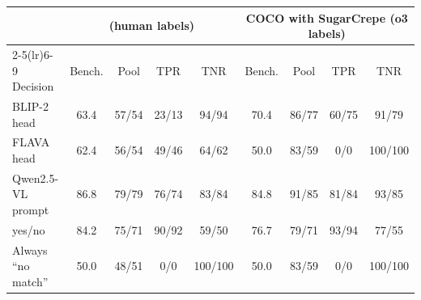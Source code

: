 \begin{tabular}{l cccc cccc}
\toprule
& \multicolumn{4}{c}{\svo{} (human labels)} & \multicolumn{4}{c}{COCO with SugarCrepe (o3 labels)}\\
\cmidrule(lr){2-5}\cmidrule(lr){6-9}
Decision & Bench. & Pool & TPR & TNR & Bench. & Pool & TPR & TNR\\
\midrule
BLIP-2 head & 63.4 & 57/54 & 23/13 & 94/94 & 70.4 & 86/77 & 60/75 & 91/79 \\
FLAVA head & 62.4 & 56/54 & 49/46 & 64/62 & 50.0 & 83/59 & 0/0 & 100/100 \\
Qwen2.5-VL prompt & 86.8 & 79/79 & 76/74 & 83/84 & 84.8 & 91/85 & 81/84 & 93/85 \\
\qemb{} yes/no & 84.2 & 75/71 & 90/92 & 59/50 & 76.7 & 79/71 & 93/94 & 77/55 \\
\midrule
Always ``no match'' & 50.0 & 48/51 & 0/0 & 100/100 & 50.0 & 83/59 & 0/0 & 100/100 \\
\bottomrule
\end{tabular}
